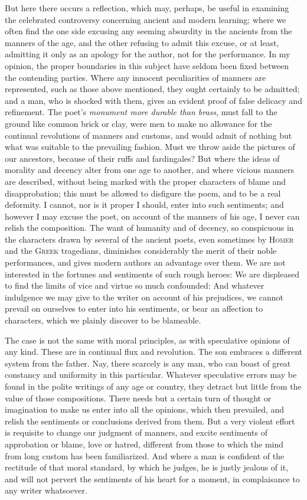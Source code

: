 But here there occurs a reflection, which may, perhaps, be useful in
examining the celebrated controversy concerning ancient and modern
learning; where we often find the one side excusing any seeming
absurdity in the ancients from the manners of the age, and the other
refusing to admit this excuse, or at least, admitting it only as an
apology for the author, not for the performance. In my opinion, the
proper boundaries in this subject have seldom been fixed between the
contending parties. Where any innocent peculiarities of manners are
represented, such as those above mentioned, they ought certainly to be
admitted; and a man, who is shocked with them, gives an evident proof
of false delicacy and refinement. The poet's \textit{monument more
durable than brass}, must fall to the ground like common brick or
clay, were men to make no allowance for the continual revolutions of
manners and customs, and would admit of nothing but what was suitable
to the prevailing fashion. Must we throw aside the pictures of our
ancestors, because of their ruffs and fardingales? But where the ideas
of morality and decency alter from one age to another, and where
vicious manners are described, without being marked with the proper
characters of blame and disapprobation; this must be allowed to
disfigure the poem, and to be a real deformity. I cannot, nor is it
proper I should, enter into such sentiments; and however I may excuse
the poet, on account of the manners of his age, I never can relish the
composition. The want of humanity and of decency, so conspicuous in
the characters drawn by several of the ancient poets, even sometimes
by \textsc{Homer} and the \textsc{Greek} tragedians, diminishes
considerably the merit of their noble performances, and gives
 modern authors an advantage over them. We are not
interested in the fortunes and sentiments of such rough heroes: We are
displeased to find the limits of vice and virtue so much confounded:
And whatever indulgence we may give to the writer on account of his
prejudices, we cannot prevail on ourselves to enter into his
sentiments, or bear an affection to characters, which we plainly
discover to be blameable.

The case is not the same with moral principles, as with speculative
opinions of any kind. These are in continual flux and revolution. The
son embraces a different system from the father. Nay, there scarcely
is any man, who can boast of great constancy and uniformity in this
particular. Whatever speculative errors may be found in the polite
writings of any age or country, they detract but little from the value
of those compositions. There needs but a certain turn of thought or
imagination to make us enter into all the opinions, which then
prevailed, and relish the sentiments or conclusions derived from them.
But a very violent effort is requisite to change our judgment of
manners, and excite sentiments of approbation or blame, love or
hatred, different from those to which the mind from long custom has
been familiarized. And where a man is confident of the rectitude of
that moral standard, by which he judges, he is justly jealous of it,
and will not pervert the sentiments of his heart for a moment, in
complaisance to any writer whatsoever.


